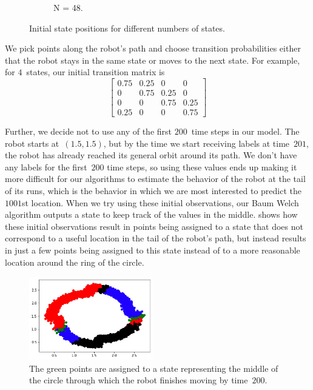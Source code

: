 \documentclass[twoside]{article}
\begin{document}
\begin{figure}[h]
\begin{subfigure}[h]{0.48\textwidth}
    \caption{N = 48.}\label{fig:48-states}
  \end{subfigure}
  \caption{Initial state positions for different numbers of states.}\label{fig:init-trans-pos}
\end{figure}
We pick points along the robot's path and choose transition probabilities either that the robot stays in the same state or moves to the next state.
For example, for $4$~states, our initial transition matrix is
\begin{equation*}
  \begin{bmatrix}
    0.75 & 0.25 & 0    & 0\\
    0    & 0.75 & 0.25 & 0\\
    0    & 0    & 0.75 & 0.25\\
    0.25 & 0    & 0    & 0.75
  \end{bmatrix}
\end{equation*}

Further, we decide not to use any of the first $\num{200}$~time steps in our model.
The robot starts at~${(1.5, 1.5)}$, but by the time we start receiving labels at time~$\num{201}$, the robot has already reached its general orbit around its path.
We don't have any labels for the first~$\num{200}$ time steps, so using these values ends up making it more difficult for our algorithms to estimate the behavior of the robot at the tail of its runs, which is the behavior in which we are most interested to predict the $\num{1001}$st location.
When we try using these initial observations, our Baum Welch algorithm outputs a state to keep track of the values in the middle.
 shows how these initial observations result in points being assigned to a state that does not correspond to a useful location in the tail of the robot's path, but instead results in just a few points being assigned to this state instead of to a more reasonable location around the ring of the circle.
\begin{figure}
  \centering
  \includegraphics[width=0.48\textwidth]{images/state-in-the-middle}
  \caption[middle]{The green points are assigned to a state representing the middle of the circle through which the robot finishes moving by time~$200$.}\label{fig:state-in-the-middle}
\end{figure}
\end{document}
